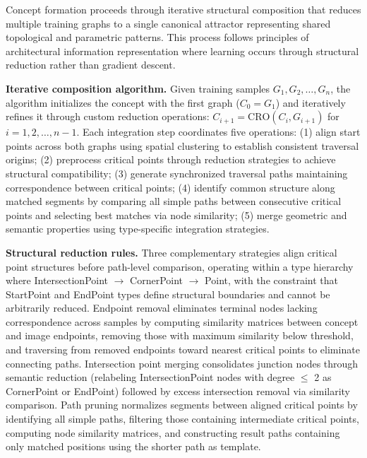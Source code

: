 \documentclass[a4paper,10pt]{article}
\begin{document}
Concept formation proceeds through iterative structural composition that reduces multiple training graphs to a single canonical attractor representing shared topological and parametric patterns. This process follows principles of architectural information representation where learning occurs through structural reduction rather than gradient descent.

\textbf{Iterative composition algorithm.} Given training samples $G_1, G_2, \ldots, G_n$, the algorithm initializes the concept with the first graph ($C_0 = G_1$) and iteratively refines it through custom reduction operations: $C_{i+1} = \text{CRO}(C_i, G_{i+1})$ for $i = 1, 2, \ldots, n-1$. Each integration step coordinates five operations: (1) align start points across both graphs using spatial clustering to establish consistent traversal origins; (2) preprocess critical points through reduction strategies to achieve structural compatibility; (3) generate synchronized traversal paths maintaining correspondence between critical points; (4) identify common structure along matched segments by comparing all simple paths between consecutive critical points and selecting best matches via node similarity; (5) merge geometric and semantic properties using type-specific integration strategies.

\textbf{Structural reduction rules.} Three complementary strategies align critical point structures before path-level comparison, operating within a type hierarchy where IntersectionPoint $\to$ CornerPoint $\to$ Point, with the constraint that StartPoint and EndPoint types define structural boundaries and cannot be arbitrarily reduced. Endpoint removal eliminates terminal nodes lacking correspondence across samples by computing similarity matrices between concept and image endpoints, removing those with maximum similarity below threshold, and traversing from removed endpoints toward nearest critical points to eliminate connecting paths. Intersection point merging consolidates junction nodes through semantic reduction (relabeling IntersectionPoint nodes with degree $\leq$ 2 as CornerPoint or EndPoint) followed by excess intersection removal via similarity comparison. Path pruning normalizes segments between aligned critical points by identifying all simple paths, filtering those containing intermediate critical points, computing node similarity matrices, and constructing result paths containing only matched positions using the shorter path as template.
\end{document}
